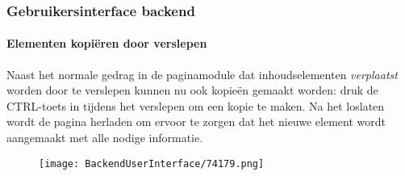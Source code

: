 \begin{frame}[fragile]
	\frametitle{Gebruikersinterface backend}
	\framesubtitle{Elementen kopiëren door verslepen}

	Naast het normale gedrag in de paginamodule dat inhoudselementen \textit{verplaatst} worden door te verslepen
	kunnen nu ook kopieën gemaakt worden: druk de CTRL-toets in tijdens het verslepen om een kopie te maken.
	Na het loslaten wordt de pagina herladen om ervoor te zorgen dat het nieuwe element wordt aangemaakt met alle
	nodige informatie.

	\begin{figure}
		\texttt{[image: BackendUserInterface/74179.png]}
	\end{figure}

\end{frame}

